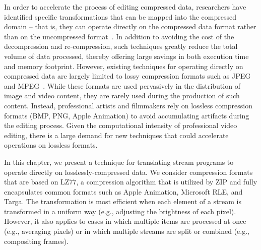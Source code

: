 In order to accelerate the process of editing compressed data,
researchers have identified specific transformations that can be
mapped into the compressed domain -- that is, they can operate directly
on the compressed data format rather than on the uncompressed
format~\cite{chang95survey,smith95survey,mandal99survey,wee02survey}.
In addition to avoiding the cost of the decompression and
re-compression, such techniques greatly reduce the total volume of
data processed, thereby offering large savings in both execution time
and memory footprint.  However, existing techniques for operating
directly on compressed data are largely limited to lossy compression
formats such as
JPEG~\cite{shen96,shen96b,smith96b,shen98,dugad01,mukherjee02,feng03}
and MPEG~\cite{smith98,vasudev98,dorai00,nang00,wee02survey}.  While
these formats are used pervasively in the distribution of image and
video content, they are rarely used during the production of such
content.  Instead, professional artists and filmmakers rely on
lossless compression formats (BMP, PNG, Apple Animation) to avoid
accumulating artifacts during the editing process.  Given the
computational intensity of professional video editing, there is a
large demand for new techniques that could accelerate operations on
lossless formats.

In this chapter, we present a technique for translating stream
programs to operate directly on losslessly-compressed data.  We
consider compression formats that are based on LZ77, a compression
algorithm that is utilized by ZIP and fully encapsulates common
formats such as Apple Animation, Microsoft RLE, and Targa.  The
transformation is most efficient when each element of a stream is
transformed in a uniform way (e.g., adjusting the brightness of each
pixel).  However, it also applies to cases in which multiple items are
processed at once (e.g., averaging pixels) or in which multiple
streams are split or combined (e.g., compositing frames).


